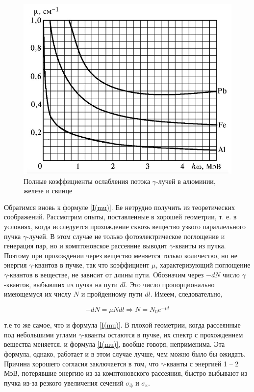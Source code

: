 \documentclass[a4paper, 12pt]{article}%
\begin{document}
	\begin{figure}[h!]
		\centering
		\includegraphics[width=0.6\linewidth]{3.jpg}
		\caption{Полные коэффициенты ослабления потока $\gamma$-лучей в алюминии, железе и свинце}
		\label{ris mu}
	\end{figure}
	
	
	Обратимся вновь к формуле \eqref{I(mu)}. Ее нетрудно получить из теоретических соображений. Рассмотрим опыты, поставленные в хорошей
	геометрии, т. е. в условиях, когда исследуется прохождение сквозь вещество узкого параллельного пучка $\gamma$-лучей. В этом случае не только
	фотоэлектрическое поглощение и генерация пар, но и комптоновское
	рассеяние выводит $\gamma$-кванты из пучка.
	Поэтому при прохождении через вещество меняется только количество, но не энергия $\gamma$-квантов в пучке, так что коэффициент $ \mu $, характеризующий поглощение $\gamma$-квантов в веществе, не зависит от длины
	пути. Обозначим через $ -dN $ число $\gamma$-квантов, выбывших из пучка на
	пути $ dl $. Это число пропорционально имеющемуся их числу $ N $ и пройденному пути $ dl $. Имеем, следовательно,
	
	\begin{equation}\label{N}
	-dN = \mu N dl \Rightarrow N = N_0 e^{-\mu l}
	\end{equation}
	
	т.е то же самое, что и формула \eqref{I(mu)}. В плохой геометрии, когда рассеянные под небольшими углами
	$\gamma$-кванты остаются в пучке, их спектр с прохождением вещества меняется, и формула \eqref{I(mu)}, вообще говоря, неприменима. Эта формула, однако, работает и в этом случае лучше, чем можно было бы ожидать. Причина хорошего согласия заключается в том, что $\gamma$-кванты с энергией 1 -- 2 МэВ, потерявшие энергию из-за комптоновского рассеяния,
	быстро выбывают из пучка из-за резкого увеличения сечений $ \sigma_{\text{ф}} $ и $ \sigma_{\text{к}} $.
	
\end{document}
